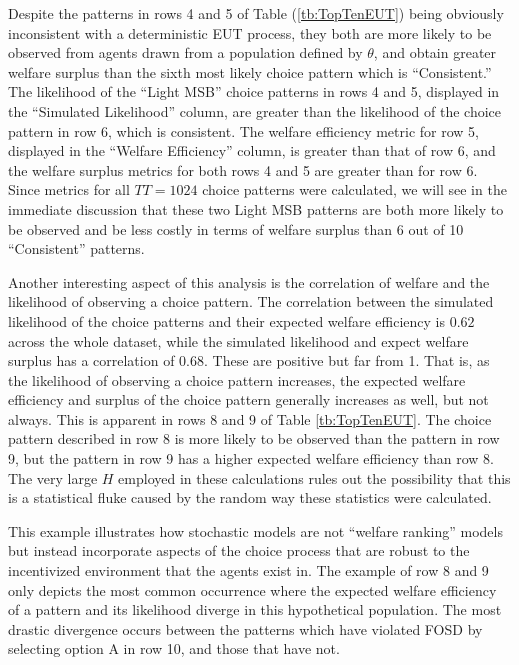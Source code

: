 \documentclass[../main.tex]{subfiles}
\begin{document}
Despite the patterns in rows 4 and 5 of Table (\ref{tb:TopTenEUT}) being obviously inconsistent with a deterministic EUT process, they both are more likely to be observed from agents drawn from a population defined by $\theta$, and obtain greater welfare surplus than the sixth most likely choice pattern which is \enquote{Consistent.}
The likelihood of the \enquote{Light MSB} choice patterns in rows 4 and 5, displayed in the \enquote{Simulated Likelihood} column, are greater than the likelihood of the choice pattern in row 6, which is consistent.
The welfare efficiency metric for row 5, displayed in the \enquote{Welfare Efficiency} column, is greater than that of row 6, and the welfare surplus metrics for both rows 4 and 5 are greater than for row 6.
Since metrics for all $TT = 1024$ choice patterns were calculated, we will see in the immediate discussion that these two Light MSB patterns are both more likely to be observed and be less costly in terms of welfare surplus than 6 out of 10 \enquote{Consistent} patterns.

\addtocounter{footnote}{-1}

Another interesting aspect of this analysis is the correlation of welfare and the likelihood of observing a choice pattern.
The correlation between the simulated likelihood of the choice patterns and their expected welfare efficiency is $0.62$ across the whole dataset, while the simulated likelihood and expect welfare surplus has a correlation of $0.68$.
These are positive but far from 1.
That is, as the likelihood of observing a choice pattern increases, the expected welfare efficiency and surplus of the choice pattern generally increases as well, but not always.
This is apparent in rows 8 and 9 of Table \ref{tb:TopTenEUT}.
The choice pattern described in row 8 is more likely to be observed than the pattern in row 9, but the pattern in row 9 has a higher expected welfare efficiency than row 8.
The very large $H$ employed in these calculations rules out the possibility that this is a statistical fluke caused by the random way these statistics were calculated.

This example illustrates how stochastic models are not \enquote{welfare ranking} models but instead incorporate aspects of the choice process that are robust to the incentivized environment that the agents exist in.
The example of row 8 and 9 only depicts the most common occurrence where the expected welfare efficiency of a pattern and its likelihood diverge in this hypothetical population.
The most drastic divergence occurs between the patterns which have violated FOSD by selecting option A in row 10, and those that have not.
\end{document}
